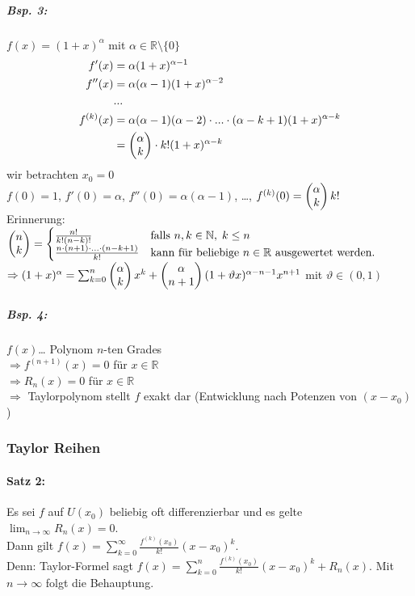 \subparagraph{Bsp. 3:} $f(x)=(1+x)^\alpha$ mit $\alpha \in \mathbb{R}\setminus \{0\}$
\begin{align*}
f'(x)&=\alpha (1+x)^{\alpha-1}\\
f''(x)&=\alpha (\alpha -1)(1+x)^{\alpha -2}\\
&...\\
f^{(k)}(x)&=\alpha (\alpha -1)(\alpha -2)\cdot ... \cdot (\alpha -k+1)(1+x)^{\alpha-k}\\
&=\begin{pmatrix}\alpha\\k\end{pmatrix}\cdot k! (1+x)^{\alpha-k}\\
\end{align*}
wir betrachten $x_0=0$\\
$f(0)=1$, $f'(0)=\alpha$, $f''(0)=\alpha(\alpha-1)$, …, $f^{(k)}(0)=\begin{pmatrix}\alpha\\k\end{pmatrix}k!$\\
Erinnerung:\\
$\begin{pmatrix}n\\k\end{pmatrix}=
\begin{cases}
\frac{n!}{k!(n-k)!} &\text{falls }n,k \in \mathbb{N}, \; k \leq n\\
\frac{n\cdot (n+1)\cdot...\cdot (n-k+1)}{k!} & \text{kann für beliebige }n\in \mathbb{R} \text{ ausgewertet werden.}
\end{cases}$\\
$\Rightarrow (1+x)^\alpha = \sum_{k=0}^n \begin{pmatrix}\alpha\\k\end{pmatrix} x^k+\begin{pmatrix}\alpha\\n+1\end{pmatrix}(1+\vartheta x)^{\alpha -n-1}x^{n+1}$ mit $\vartheta\in (0,1)$
\subparagraph{Bsp. 4:} $f(x)$… Polynom $n$-ten Grades\\
$\Rightarrow f^{(n+1)}(x)=0$ für $x \in \mathbb{R}$\\
$\Rightarrow R_n(x)=0$ für $x \in \mathbb{R}$\\
$\Rightarrow$ Taylorpolynom stellt $f$ exakt dar (Entwicklung nach Potenzen von $(x-x_0)$)

\subsubsection{Taylor Reihen}
\paragraph{Satz 2:} Es sei $f$ auf $U(x_0)$ beliebig oft differenzierbar und es gelte $\lim_{n\to\infty} R_n(x)=0$.\\
Dann gilt $\boxed{f(x)=\sum_{k=0}^\infty \frac{f^{(k)}(x_0)}{k!}(x-x_0)^k}$.\\
Denn: Taylor-Formel sagt $f(x)=\sum_{k=0}^n \frac{f^{(k)}(x_0)}{k!}(x-x_0)^k + R_n(x)$. Mit $n\to \infty$ folgt die Behauptung.

